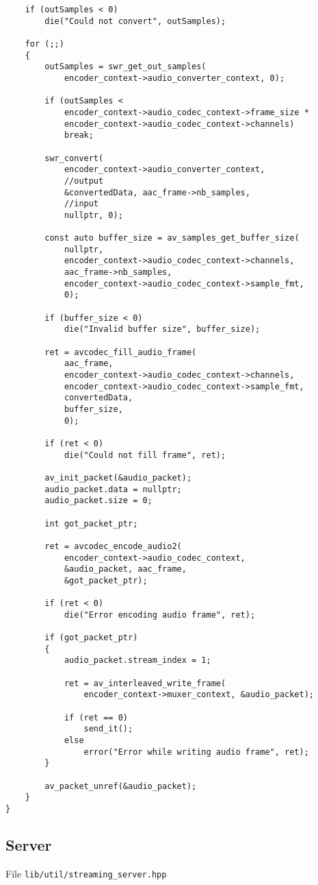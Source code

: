 \begin{lstlisting}
	if (outSamples < 0)
		die("Could not convert", outSamples);

	for (;;)
	{
		outSamples = swr_get_out_samples(
			encoder_context->audio_converter_context, 0);

		if (outSamples < 
			encoder_context->audio_codec_context->frame_size * 
			encoder_context->audio_codec_context->channels)
			break;

		swr_convert(
			encoder_context->audio_converter_context,
			//output
			&convertedData, aac_frame->nb_samples,
			//input
			nullptr, 0);

		const auto buffer_size = av_samples_get_buffer_size(
			nullptr,
			encoder_context->audio_codec_context->channels,
			aac_frame->nb_samples,
			encoder_context->audio_codec_context->sample_fmt,
			0);

		if (buffer_size < 0)
			die("Invalid buffer size", buffer_size);

		ret = avcodec_fill_audio_frame(
			aac_frame,
			encoder_context->audio_codec_context->channels,
			encoder_context->audio_codec_context->sample_fmt,
			convertedData,
			buffer_size,
			0);

		if (ret < 0)
			die("Could not fill frame", ret);

		av_init_packet(&audio_packet);
		audio_packet.data = nullptr;
		audio_packet.size = 0;

		int got_packet_ptr;

		ret = avcodec_encode_audio2(
			encoder_context->audio_codec_context, 
			&audio_packet, aac_frame, 
			&got_packet_ptr);

		if (ret < 0)
			die("Error encoding audio frame", ret);

		if (got_packet_ptr)
		{
			audio_packet.stream_index = 1;

			ret = av_interleaved_write_frame(
				encoder_context->muxer_context, &audio_packet);

			if (ret == 0)
				send_it();
			else
				error("Error while writing audio frame", ret);
		}

		av_packet_unref(&audio_packet);
	}
}
\end{lstlisting}


\newpage
\subsection{Server}
File \verb|lib/util/streaming_server.hpp|

